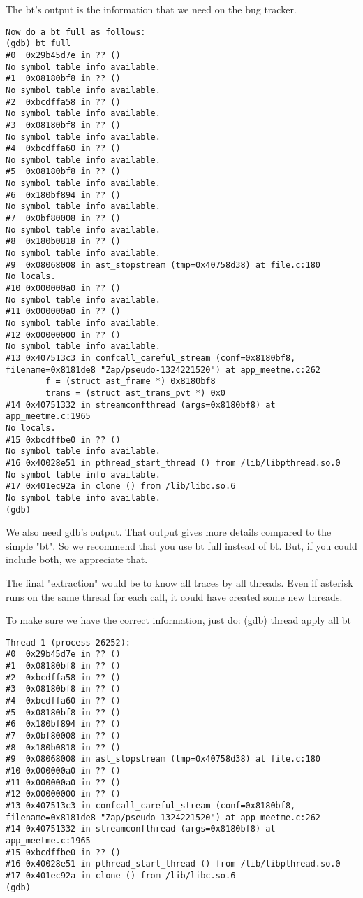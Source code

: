 The bt's output is the information that we need on the bug tracker.

\begin{astlisting}
\begin{verbatim}
Now do a bt full as follows:
(gdb) bt full
#0  0x29b45d7e in ?? ()
No symbol table info available.
#1  0x08180bf8 in ?? ()
No symbol table info available.
#2  0xbcdffa58 in ?? ()
No symbol table info available.
#3  0x08180bf8 in ?? ()
No symbol table info available.
#4  0xbcdffa60 in ?? ()
No symbol table info available.
#5  0x08180bf8 in ?? ()
No symbol table info available.
#6  0x180bf894 in ?? ()
No symbol table info available.
#7  0x0bf80008 in ?? ()
No symbol table info available.
#8  0x180b0818 in ?? ()
No symbol table info available.
#9  0x08068008 in ast_stopstream (tmp=0x40758d38) at file.c:180
No locals.
#10 0x000000a0 in ?? ()
No symbol table info available.
#11 0x000000a0 in ?? ()
No symbol table info available.
#12 0x00000000 in ?? ()
No symbol table info available.
#13 0x407513c3 in confcall_careful_stream (conf=0x8180bf8, filename=0x8181de8 "Zap/pseudo-1324221520") at app_meetme.c:262
        f = (struct ast_frame *) 0x8180bf8
        trans = (struct ast_trans_pvt *) 0x0
#14 0x40751332 in streamconfthread (args=0x8180bf8) at app_meetme.c:1965
No locals.
#15 0xbcdffbe0 in ?? ()
No symbol table info available.
#16 0x40028e51 in pthread_start_thread () from /lib/libpthread.so.0
No symbol table info available.
#17 0x401ec92a in clone () from /lib/libc.so.6
No symbol table info available.
(gdb)
\end{verbatim}
\end{astlisting}

We also need gdb's output. That output gives more details compared to
the simple "bt". So we recommend that you use bt full instead of bt.
But, if you could include both, we appreciate that.

The final "extraction" would be to know all traces by all
threads. Even if asterisk runs on the same thread for each call, it
could have created some new threads.

To make sure we have the correct information, just do:
(gdb) thread apply all bt

\begin{astlisting}
\begin{verbatim}
Thread 1 (process 26252):
#0  0x29b45d7e in ?? ()
#1  0x08180bf8 in ?? ()
#2  0xbcdffa58 in ?? ()
#3  0x08180bf8 in ?? ()
#4  0xbcdffa60 in ?? ()
#5  0x08180bf8 in ?? ()
#6  0x180bf894 in ?? ()
#7  0x0bf80008 in ?? ()
#8  0x180b0818 in ?? ()
#9  0x08068008 in ast_stopstream (tmp=0x40758d38) at file.c:180
#10 0x000000a0 in ?? ()
#11 0x000000a0 in ?? ()
#12 0x00000000 in ?? ()
#13 0x407513c3 in confcall_careful_stream (conf=0x8180bf8, filename=0x8181de8 "Zap/pseudo-1324221520") at app_meetme.c:262
#14 0x40751332 in streamconfthread (args=0x8180bf8) at app_meetme.c:1965
#15 0xbcdffbe0 in ?? ()
#16 0x40028e51 in pthread_start_thread () from /lib/libpthread.so.0
#17 0x401ec92a in clone () from /lib/libc.so.6
(gdb)
\end{verbatim}
\end{astlisting}

